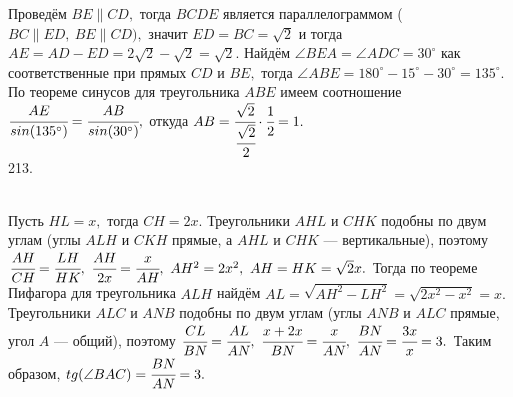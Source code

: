 \documentclass[12pt]{article}
\begin{document}
Проведём $BE\parallel CD,$ тогда $BCDE$ является параллелограммом ($BC\parallel ED,\ BE\parallel CD),$ значит $ED=BC=\sqrt{2}$ и тогда $AE=AD-ED=2\sqrt{2}-\sqrt{2}=\sqrt{2}.$ Найдём $\angle BEA=\angle ADC=30^\circ$ как соответственные при прямых $CD$ и $BE,$ тогда $\angle ABE=180^\circ-15^\circ-30^\circ=135^\circ.$ По теореме синусов для треугольника $ABE$ имеем соотношение $\cfrac{AE}{sin(135^\circ)}=\cfrac{AB}{sin(30^\circ)},$ откуда $AB=\cfrac{\sqrt{2}}{\cfrac{\sqrt{2}}{2}}\cdot\cfrac{1}{2}=1.$\\
213. \begin{figure}[ht!]
\end{figure}\\
Пусть  $HL=x,$ тогда $CH=2x.$ Треугольники $AHL$ и $CHK$ подобны по двум углам (углы $ALH$ и $CKH$ прямые, а $AHL$ и $CHK$ --- вертикальные), поэтому $\cfrac{AH}{CH}=\cfrac{LH}{HK},\ \cfrac{AH}{2x}=\cfrac{x}{AH},\ AH^2=2x^2,\ AH=HK=\sqrt{2}x.$ Тогда по теореме Пифагора для треугольника $ALH$ найдём $AL=\sqrt{AH^2-LH^2}=\sqrt{2x^2-x^2}=x.$ Треугольники $ALC$ и $ANB$ подобны по двум углам (углы $ANB$ и $ALC$ прямые, угол $A$ --- общий), поэтому
$\cfrac{CL}{BN}=\cfrac{AL}{AN},\ \cfrac{x+2x}{BN}=\cfrac{x}{AN},\ \cfrac{BN}{AN}=\cfrac{3x}{x}=3.$ Таким образом, $tg(\angle BAC)=\cfrac{BN}{AN}=3.$\\
\end{document}
